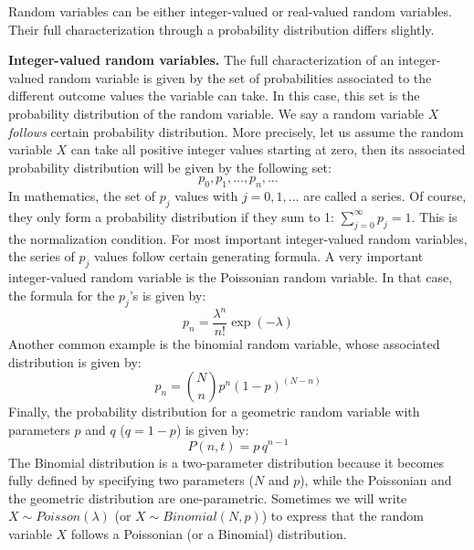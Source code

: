 Random variables can be either integer-valued or real-valued random variables. Their full characterization through a probability distribution differs slightly. 
\smallskip

{\bf Integer-valued random variables.} The full characterization of an integer-valued random variable is given by the set of probabilities associated to the different outcome values the variable can take. In this case, this set is the probability distribution of the random variable. We say a random variable $X$ {\it follows} certain probability distribution. More precisely, let us assume the random variable $X$ can take all positive integer values starting at zero, then its associated probability distribution will be given by the following set: 
\begin{equation}
p_0, p_1, \dots, p_n, \dots
\end{equation}
In mathematics, the set of $p_j$ values with $j=0,1,\dots$ are called a series. Of course, they only form a probability distribution if they sum to 1: $\sum_{j=0}^{\infty} p_j = 1$. This is the normalization condition. For most important integer-valued random variables, the series of $p_j$ values follow certain generating formula. A very important integer-valued random variable is the Poissonian random variable. In that case, the formula for the $p_j$'s is given by:
\begin{equation}
    p_n = \frac{\lambda^n}{n!} \exp(-\lambda)
\end{equation}
Another common example is the binomial random variable, whose associated distribution is given by:
\begin{equation}
    p_n = \binom{N}{n} p^n (1-p)^{(N-n)}
\end{equation}
Finally, the probability distribution for a geometric random variable with parameters $p$ and $q$ ($q = 1-p$) is given by:
\begin{equation}
    P(n,t) = p\,q^{n-1}
\end{equation}
The Binomial distribution is a two-parameter distribution because it becomes fully defined by specifying two parameters ($N$ and $p$), while the Poissonian and the geometric distribution are one-parametric. Sometimes we will write $X \sim Poisson(\lambda)$ (or $X \sim Binomial(N,p)$) to express that the random variable $X$ follows a Poissonian (or a Binomial) distribution. 
\smallskip


